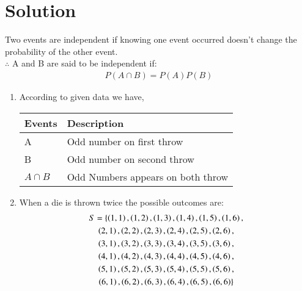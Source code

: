 \documentclass[journal,12pt,twocolumn]{IEEEtran}
\begin{document}
\section{Solution}
\begin{lemma}
Two events are independent if knowing one event occurred doesn't change the probability of the other event.
\\
$\therefore$ A and B are said to be independent if:
\begin{align}
 P(A \cap B)=P(A)P(B)   
\end{align}
\label{lemma1}
\end{lemma} 
\begin{enumerate}
\item According to given data we have,
\begin{table}[ht!]
\begin{tabular}{|l|l|}
\hline
\textbf{Events} & \textbf{Description}                         \\ \hline
A & Odd number on first throw
\\ \hline
B & Odd number on second throw 
\\ \hline
$A\cap B$ & Odd Numbers appears on both throw  \\ \hline
\end{tabular}
\end{table}
\item When a die is thrown twice the possible outcomes are:
\begin{multline}
  S=\{\left(1,1\right),\left(1,2\right),\left(1,3\right),\left(1,4\right),\left(1,5\right),\left(1,6\right),
\\\left(2,1\right),\left(2,2\right),\left(2,3\right),\left(2,4\right),\left(2,5\right),\left(2,6\right),
\\\left(3,1\right),\left(3,2\right),\left(3,3\right),\left(3,4\right),\left(3,5\right),\left(3,6\right),
\\\left(4,1\right),\left(4,2\right),\left(4,3\right),\left(4,4\right),\left(4,5\right),\left(4,6\right),
\\\left(5,1\right),\left(5,2\right),\left(5,3\right),\left(5,4\right),\left(5,5\right),\left(5,6\right),
  \\\left(6,1\right),\left(6,2\right),\left(6,3\right),\left(6,4\right),\left(6,5\right),\left(6,6\right)\}
\end{multline}


\end{enumerate}
\end{document}
